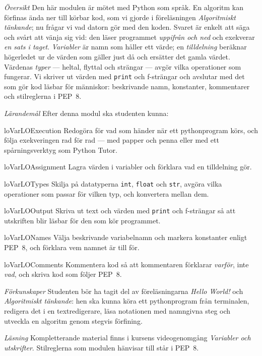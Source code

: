 \emph{Översikt}
Den här modulen är mötet med Python som språk.  En algoritm kan förfinas
ända ner till körbar kod, som vi gjorde i föreläsningen \emph{Algoritmiskt
tänkande}; nu frågar vi vad datorn gör med den koden.  Svaret är enkelt
att säga och svårt att vänja sig vid: den läser programmet \emph{uppifrån
och ned} och exekverar \emph{en sats i taget}.  \emph{Variabler} är namn
som håller ett värde; en \emph{tilldelning} beräknar högerledet ur de
värden som gäller just då och ersätter det gamla värdet.  Värdenas
\emph{typer} --- heltal, flyttal och strängar --- avgör vilka operationer
som fungerar.  Vi skriver ut värden med \texttt{print} och
f-strängar och avslutar med det som gör kod läsbar för människor:
beskrivande namn, konstanter, kommentarer och stilreglerna i PEP~8.

\emph{Lärandemål}
Efter denna modul ska studenten kunna:
\begin{restatable}{lo}{VarLOExecution}\label{VarLOExecution}%
  Redogöra för vad som händer när ett pythonprogram körs, och följa
  exekveringen rad för rad --- med papper och penna eller med ett
  spårningsverktyg som Python Tutor.
\end{restatable}
\begin{restatable}{lo}{VarLOAssignment}\label{VarLOAssignment}%
  Lagra värden i variabler och förklara vad en tilldelning gör.
\end{restatable}
\begin{restatable}{lo}{VarLOTypes}\label{VarLOTypes}%
  Skilja på datatyperna \texttt{int}, \texttt{float}
  och \texttt{str}, avgöra vilka operationer som passar för
  vilken typ, och konvertera mellan dem.
\end{restatable}
\begin{restatable}{lo}{VarLOOutput}\label{VarLOOutput}%
  Skriva ut text och värden med \texttt{print} och f-strängar
  så att utskriften blir läsbar för den som kör programmet.
\end{restatable}
\begin{restatable}{lo}{VarLONames}\label{VarLONames}%
  Välja beskrivande variabelnamn och markera konstanter enligt PEP~8, och
  förklara vem namnet är till för.
\end{restatable}
\begin{restatable}{lo}{VarLOComments}\label{VarLOComments}%
  Kommentera kod så att kommentaren förklarar \emph{varför}, inte
  \emph{vad}, och skriva kod som följer PEP~8.
\end{restatable}

\emph{Förkunskaper}
Studenten bör ha tagit del av föreläsningarna \emph{Hello World!} och
\emph{Algoritmiskt tänkande}: hen ska kunna köra ett pythonprogram från
terminalen, redigera det i en textredigerare, läsa notationen med
namngivna steg och utveckla en algoritm genom stegvis förfining.

\emph{Läsning}
Kompletterande material finns i kursens videogenomgång \emph{Variabler och
utskrifter}.  Stilreglerna som modulen hänvisar till står i
PEP~8\autocite{pep8}.
